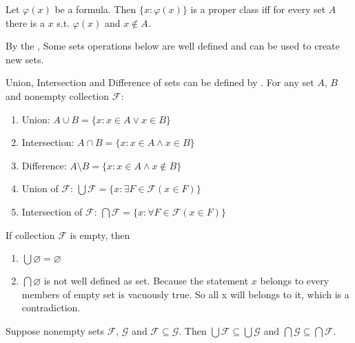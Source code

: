 \begin{corollary}{}{}
    Let $\varphi(x)$ be a formula. Then $\{x:\varphi(x)\}$ is a proper class iff for every set $A$ there is a $x$ s.t. $\varphi(x)$ and $x \notin A$.
    
\end{corollary}
By the , Some sets operations below are well defined and can be used to create new sets.

\begin{corollary}{}{}
    Union, Intersection and Difference of sets can be defined by . For any set $A$, $B$ and nonempty collection $\mathcal{F}$:\\
    \begin{enumerate}
        \item Union: $A \cup B = \{x: x \in A \lor x \in B\} $ 
        \item Intersection: $A \cap B = \{x: x \in A \land x \in B\}$
        \item Difference: $A \setminus B = \{x: x \in A \land x \notin B\}$
        \item Union of $\mathcal{F}$: $\bigcup \mathcal{F} = \{x: \exists F \in \mathcal{F}(x\in F)\}$
        \item Intersection of $\mathcal{F}$: $\bigcap \mathcal{F} = \{x: \forall F \in \mathcal{F}(x\in F)\}$
    \end{enumerate}
\end{corollary}

\begin{remark}
    If collection $\mathcal{F}$ is empty, then\\
    \begin{enumerate}
        \item $\bigcup \varnothing = \varnothing$ 
        \item $\bigcap \varnothing$ is not well defined as set. Because the statement $x$ belongs to every members of empty set is vacuously true. So all x will belongs to it, which is a contradiction.
    \end{enumerate}
\end{remark}

\begin{theorem}{}{}
    Suppose nonempty sets $\mathcal{F}$, $\mathcal{G}$ and $\mathcal{F} \subseteq \mathcal{G}$. Then $\bigcup \mathcal{F} \subseteq \bigcup \mathcal{G}$ and $\bigcap \mathcal{G} \subseteq \bigcap \mathcal{F}$.
    
\end{theorem}


